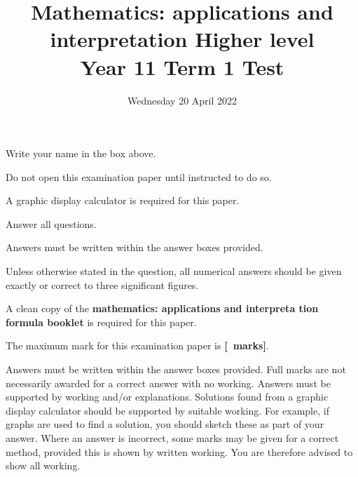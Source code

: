 \documentclass{source/ib-exam}
\title{Mathematics: applications and interpretation \linebreak Higher level \\[1ex] Year 11 Term 1 Test}
\date{Wednesday 20 April 2022}
\begin{document}
\raggedright

\begin{instructionslist}
    \item Write your name in the box above.
    \item Do not open this examination paper until instructed to do so.
    \item A graphic display calculator is required for this paper.
    \item Answer all questions.
    \item Answers must be written within the answer boxes provided.
    \item Unless otherwise stated in the question, all numerical answers should be given exactly or correct to three significant figures.
    \item A clean copy of the \textbf{mathematics: applications and interpreta
    tion formula booklet} is required for this paper.
    \item The maximum mark for this examination paper is \textbf{[\numpoints\ marks]}.%
\end{instructionslist}

\maketitle

\donotwrite
\newpage

Answers must be written within the answer boxes provided. Full marks are not necessarily awarded for a correct answer with no working. Answers must be supported by working and/or explanations. Solutions found from a graphic display calculator should be supported by suitable working. For example, if graphs are used to find a solution, you should sketch these as part of your answer. Where an answer is incorrect, some marks may be given for a correct method, provided this is shown by written working. \linebreak You are therefore advised to show all working.
\end{document}
